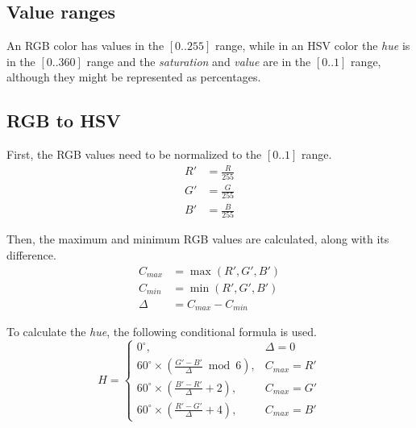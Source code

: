 \documentclass{amsart}
\begin{document}
\subsection{Value ranges}

An RGB color has values in the $[0..255]$ range, while in an HSV color the
\textit{hue} is in the $[0..360]$ range and the \textit{saturation} and
\textit{value} are in the $[0..1]$ range, although they might be represented as
percentages.

\subsection{RGB to HSV}

First, the RGB values need to be normalized to the $[0..1]$ range.
\begin{align*}
  R' &= \frac{R}{255} \\
  G' &= \frac{G}{255} \\
  B' &= \frac{B}{255}
\end{align*}

Then, the maximum and minimum RGB values are calculated, along with its
difference.
\begin{align*}
  C_{max} &= \max(R', G', B') \\
  C_{min} &= \min(R', G', B') \\
  \Delta  &= C_{max} - C_{min}
\end{align*}

To calculate the \textit{hue}, the following conditional formula is used.
\begin{displaymath}
  H =
  \begin{cases}
    0^\circ,                                                    & \Delta = 0 \\
    60^\circ \times \left(\frac{G'-B'}{\Delta} \bmod 6 \right), & C_{max} = R' \\
    60^\circ \times \left(\frac{B'-R'}{\Delta} + 2 \right),     & C_{max} = G' \\
    60^\circ \times \left(\frac{R'-G'}{\Delta} + 4 \right),     & C_{max} = B'
  \end{cases}
\end{displaymath}
\end{document}
